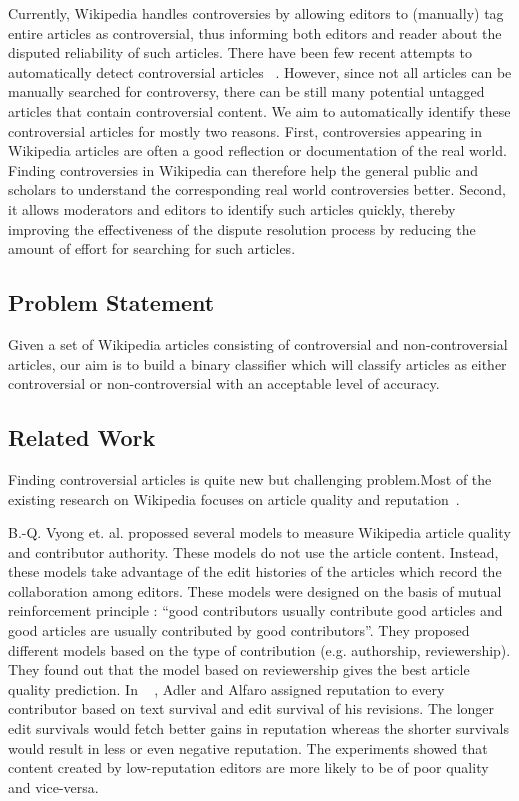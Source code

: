 \documentclass[twocolumn]{article}
\begin{document}
	Currently, Wikipedia handles controversies by allowing editors
        to (manually) tag entire articles as controversial, thus
        informing both editors and reader about the disputed
        reliability of such articles. There have been few recent
        attempts to automatically detect controversial articles
        ~\cite{Kittur, conf/wsdm/VuongLSLL08, conf/ht/RadMRB12}. However, since not all articles can be manually searched for controversy, there can be still many potential untagged articles that contain controversial content. We aim to automatically identify these controversial articles for mostly two reasons. First, controversies appearing in Wikipedia articles are often a good reflection or documentation of the real world. Finding controversies in Wikipedia can therefore help the general public and scholars to understand the corresponding real world controversies better. Second, it allows moderators and editors to identify such articles quickly, thereby improving the effectiveness of the dispute resolution process by reducing the amount of effort for searching for such articles. \\

\subsection{Problem Statement}

Given a set of Wikipedia articles consisting of controversial and non-controversial articles, our aim is to build a binary classifier which will classify articles as either controversial or non-controversial with an acceptable level of accuracy.

\subsection{Related Work}

  Finding controversial articles is quite new but challenging
problem.Most of the existing research on Wikipedia focuses on article
quality and
reputation~\cite{AdlAlf2007,anthony2005eqi,conf/cikm/HuLSLV07,conf/webi/LimVLS06,conf/pst/ZengADFM06}.

  B.-Q. Vyong et. al. propossed several models to measure Wikipedia
  article quality and contributor authority. These models do not use
  the article content. Instead, these models take advantage of the
  edit histories of the articles which record the collaboration among
  editors. These models were designed on the basis of mutual
  reinforcement principle : ``good contributors usually contribute
  good articles and good articles are usually contributed by good
  contributors''. They proposed different models based on the type of
  contribution (e.g. authorship, reviewership). They found out that
  the model based on reviewership gives the best article quality
  prediction. In ~\cite{AdlAlf2007} , Adler and Alfaro assigned
  reputation to every contributor based on text survival and edit
  survival of his revisions. The longer edit survivals would fetch
  better gains in reputation whereas the shorter survivals would
  result in less or even negative reputation. The experiments showed
  that content created by low-reputation editors are more likely to be
  of poor quality and vice-versa.
\end{document}
